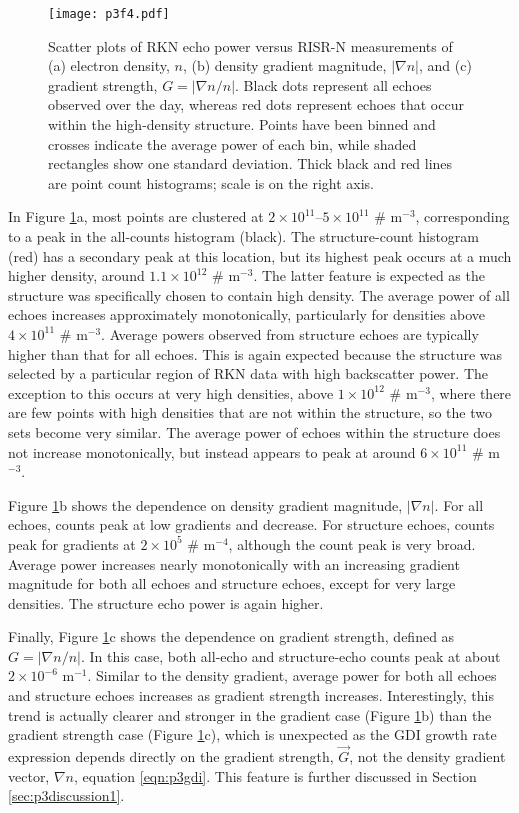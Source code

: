 \begin{figure}
\texttt{[image: p3f4.pdf]}
  \caption[Irregularity Dependence on Density Factors]{Scatter plots of RKN echo power versus RISR-N measurements of (a) electron density, \(n\), (b) density gradient magnitude, \(|\nabla n|\), and (c) gradient strength, \(G=|\nabla n/n|\).  Black dots represent all echoes observed over the day, whereas red dots represent echoes that occur within the high-density structure.  Points have been binned and crosses indicate the average power of each bin, while shaded rectangles show one standard deviation. Thick black and red lines are point count histograms; scale is on the right axis.}
  \label{fig:density}
\end{figure}

In Figure \ref{fig:density}a, most points are clustered at \(2\times10^{11}\)--\(5\times10^{11}\) \# m\(^{-3}\), corresponding to a peak in the all-counts histogram (black).  The structure-count histogram (red) has a secondary peak at this location, but its highest peak occurs at a much higher density, around \(1.1\times10^{12}\) \# m\(^{-3}\).  The latter feature is expected as the structure was specifically chosen to contain high density. The average power of all echoes increases approximately monotonically, particularly for densities above \(4\times10^{11}\) \# m\(^{-3}\). Average powers observed from structure echoes are typically higher than that for all echoes.  This is again expected because the structure was selected by a particular region of RKN data with high backscatter power.  The exception to this occurs at very high densities, above \(1\times10^{12}\) \# m\(^{-3}\), where there are few points with high densities that are not within the structure, so the two sets become very similar.  The average power of echoes within the structure does not increase monotonically, but instead appears to peak at around \(6\times10^{11}\) \# m\(^{-3}\).

Figure \ref{fig:density}b shows the dependence on density gradient magnitude, \(|\nabla n|\).  For all echoes, counts peak at low gradients and decrease.  For structure echoes, counts peak for gradients at \(2\times10^5\) \# m\(^{-4}\), although the count peak is very broad.  Average power increases nearly monotonically with an increasing gradient magnitude for both all echoes and structure echoes, except for very large densities. The structure echo power is again higher.

Finally, Figure \ref{fig:density}c shows the dependence on gradient strength, defined as \(G = |\nabla n/n|\).  In this case, both all-echo and structure-echo counts peak at about \(2\times10^{-6}\) m\(^{-1}\).  Similar to the density gradient, average power for both all echoes and structure echoes increases as gradient strength increases.  Interestingly, this trend is actually clearer and stronger in the gradient case (Figure \ref{fig:density}b) than the gradient strength case (Figure \ref{fig:density}c), which is unexpected as the GDI growth rate expression depends directly on the gradient strength, \(\vec{G}\), not the density gradient vector, \(\nabla n\), equation \ref{eqn:p3gdi}.  This feature is further discussed in Section \ref{sec:p3discussion1}.



